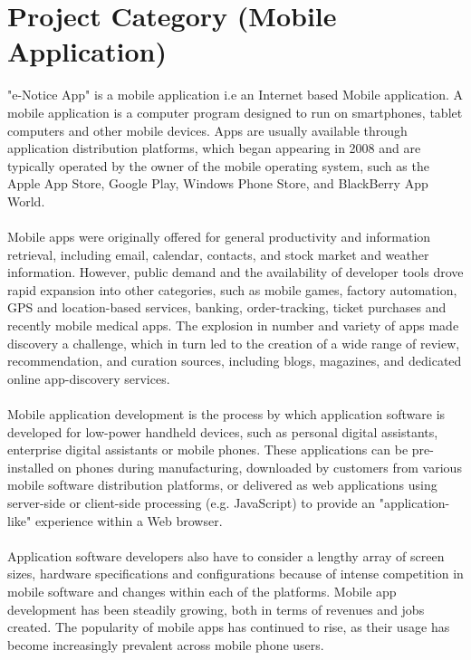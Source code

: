 \pagebreak
\section{Project Category (Mobile Application) }

"e-Notice App" is a mobile application i.e an Internet based Mobile application. A mobile application is a computer program designed to run on smartphones, tablet computers and other mobile devices.
Apps are usually available through application distribution platforms, which began appearing in 2008 and are typically operated by the owner of the mobile operating system, such as the Apple App Store, Google Play, Windows Phone Store, and BlackBerry App World.\\\\
Mobile apps were originally offered for general productivity and information retrieval, including email, calendar, contacts, and stock market and weather information. However, public demand and the availability of developer tools drove rapid expansion into other categories, such as mobile games, factory automation, GPS and location-based services, banking, order-tracking, ticket purchases and recently mobile medical apps. The explosion in number and variety of apps made discovery a challenge, which in turn led to the creation of a wide range of review, recommendation, and curation sources, including blogs, magazines, and dedicated online app-discovery services.
\\ \\
Mobile application development is the process by which application software is developed for low-power handheld devices, such as personal digital assistants, enterprise digital assistants or mobile phones. These applications can be pre-installed on phones during manufacturing, downloaded by customers from various mobile software distribution platforms, or delivered as web applications using server-side or client-side processing (e.g. JavaScript) to provide an "application-like" experience within a Web browser.\\ \\
 Application software developers also have to consider a lengthy array of screen sizes, hardware specifications and configurations because of intense competition in mobile software and changes within each of the platforms. Mobile app development has been steadily growing, both in terms of revenues and jobs created. 
The popularity of mobile apps has continued to rise, as their usage has become increasingly prevalent across mobile phone users.

